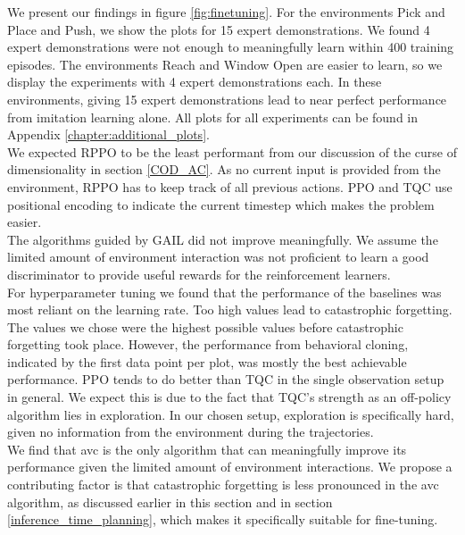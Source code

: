 We present our findings in figure \ref{fig:finetuning}. 
For the environments Pick and Place and Push, we show the plots for 15 expert demonstrations. We found 4 expert demonstrations were not 
enough to meaningfully learn within 400 training episodes. The environments Reach and Window Open are easier to learn, so we display the 
experiments with 4 expert demonstrations each. In these environments, giving 15 expert demonstrations lead to near perfect performance from imitation learning alone. 
All plots for all experiments can be found in Appendix \ref{chapter:additional_plots}.\\

We expected RPPO to be the least performant from our discussion of the curse of dimensionality in section \ref{COD_AC}. As no current input 
is provided from the environment, RPPO has to keep track of all previous actions. PPO and TQC use positional encoding to indicate the current 
timestep which makes the problem easier.\\ 

The algorithms guided by GAIL did not improve meaningfully. We assume the limited amount of environment 
interaction was not proficient to learn a good discriminator to provide useful rewards for the reinforcement learners.\\ 

For hyperparameter tuning we found that the performance of the baselines was most 
reliant on the learning rate. Too high values lead to catastrophic forgetting. The values we chose were the highest possible values before 
catastrophic forgetting took place. However, the performance from behavioral cloning, indicated by the first data point per plot, was mostly 
the best achievable performance. PPO tends to do better than TQC in the single observation setup in general. We expect this is due to the 
fact that TQC's strength as an off-policy algorithm lies in exploration. In our chosen setup, exploration is specifically hard, given no 
information from the environment during the trajectories.\\

We find that \ac{avc} is the only algorithm that can meaningfully improve its performance given the limited amount of environment interactions. 
We propose a contributing factor is that catastrophic forgetting is less pronounced in the \ac{avc} algorithm, as discussed earlier in this section and in section \ref{inference_time_planning}, 
which makes it specifically suitable for fine-tuning.



